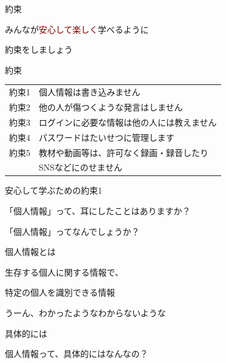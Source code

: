 \documentclass[
  ignorenonframetext,
  aspectratio=169,
  xcolor=dvipsnames]{beamer}
\begin{document}
\begin{frame}{約束}
\protect{}\label{ux7d04ux675f}
\LARGE

みんなが\textcolor{Maroon}{安心して楽しく}学べるように

\pause

約束をしましょう
\end{frame}

\begin{frame}{約束}
\protect{}\label{ux7d04ux675f-1}
\Large

\begin{tabular}{ll}
約束1& 個人情報は書き込みません\\\pause
約束2& 他の人が傷つくような発言はしません\\\pause
約束3& ログインに必要な情報は他の人には教えません\\\pause
約束4& パスワードはたいせつに管理します\\\pause
約束5& 教材や動画等は、許可なく録画・録音したり\\
&      SNSなどにのせません
\end{tabular}
\end{frame}

\begin{frame}{安心して学ぶための約束1}
\protect{}\label{ux5b89ux5fc3ux3057ux3066ux5b66ux3076ux305fux3081ux306eux7d04ux675f1}
\LARGE

\pause

「個人情報」って、耳にしたことはありますか？

\pause

「個人情報」ってなんでしょうか？
\end{frame}

\begin{frame}{個人情報とは}
\protect{}\label{ux500bux4ebaux60c5ux5831ux3068ux306f}
\LARGE

生存する個人に関する情報で、

特定の個人を識別できる情報

\vfill
\pause

うーん、わかったようなわからないような
\end{frame}

\begin{frame}{具体的には}
\protect{}\label{ux5177ux4f53ux7684ux306bux306f}
\LARGE

個人情報って、具体的にはなんなの？
\end{frame}
\end{document}
